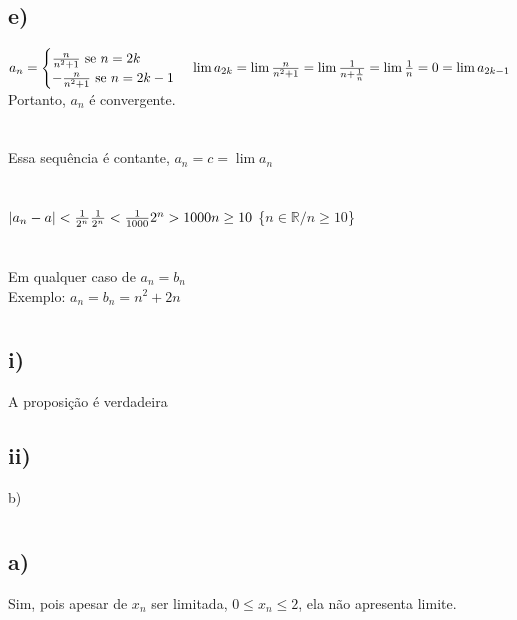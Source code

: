 \documentclass{article}
\begin{document}
\subsection*{e)}
$a_n = 
\begin{cases}
    \frac{n}{n^2+1} \text{ se $n = 2k$}\\
    -\frac{n}{n^2+1} \text{ se $n = 2k-1$}
\end{cases}\\
\lim a_{2k} = \lim \frac{n}{n^2+1}=\lim \frac{1}{n + \frac{1}{n}} = \lim \frac{1}{n} = 0 = \lim a_{2k-1}$\\
Portanto, $a_n$ é convergente.

\section{}
Essa sequência é contante, $a_n = c = \lim a_n$

\section{}
$|a_n-a| < \frac{1}{2^n}\\
\frac{1}{2^n} < \frac{1}{1000}\\
2^n > 1000\\
n \geq 10$ \hspace{30pt} \{$n \in \mathbb{R}/ n \geq 10$\}

\section{}
Em qualquer caso de $a_n = b_n$\\
Exemplo: $a_n = b_n = n^2 + 2n$

\section{}
\subsection*{i)} A proposição é verdadeira

\subsection*{ii)} b)

\section{}
\subsection*{a)} Sim, pois apesar de $x_n$ ser limitada, $0 \leq x_n \leq 2$, ela não apresenta limite.
\end{document}
